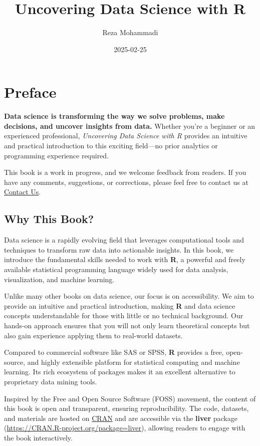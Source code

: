 \documentclass[
]{book}
\title{Uncovering Data Science with R}
\author{Reza Mohammadi}
\date{2025-02-25}
\theoremstyle{definition}
\theoremstyle{definition}
\theoremstyle{definition}
\theoremstyle{definition}
\theoremstyle{remark}
\begin{document}
\maketitle

{
\setcounter{tocdepth}{1}
\tableofcontents
}
\chapter*{Preface}\label{preface}

\textbf{Data science is transforming the way we solve problems, make decisions, and uncover insights from data.} Whether you're a beginner or an experienced professional, \emph{Uncovering Data Science with R} provides an intuitive and practical introduction to this exciting field---no prior analytics or programming experience required.

This book is a work in progress, and we welcome feedback from readers. If you have any comments, suggestions, or corrections, please feel free to contact us at \href{mailto:a.mohammadi@uva.nl}{Contact Us}.

\section*{Why This Book?}\label{why-this-book}

Data science is a rapidly evolving field that leverages computational tools and techniques to transform raw data into actionable insights. In this book, we introduce the fundamental skills needed to work with \textbf{R}, a powerful and freely available statistical programming language widely used for data analysis, visualization, and machine learning.

Unlike many other books on data science, our focus is on accessibility. We aim to provide an intuitive and practical introduction, making \textbf{R} and data science concepts understandable for those with little or no technical background. Our hands-on approach ensures that you will not only learn theoretical concepts but also gain experience applying them to real-world datasets.

Compared to commercial software like SAS or SPSS, \textbf{R} provides a free, open-source, and highly extensible platform for statistical computing and machine learning. Its rich ecosystem of packages makes it an excellent alternative to proprietary data mining tools.

Inspired by the Free and Open Source Software (FOSS) movement, the content of this book is open and transparent, ensuring reproducibility. The code, datasets, and materials are hosted on \href{https://cran.r-project.org/web/packages/liver/index.html}{CRAN} and are accessible via the \textbf{liver} package (\url{https://CRAN.R-project.org/package=liver}), allowing readers to engage with the book interactively.
\end{document}
